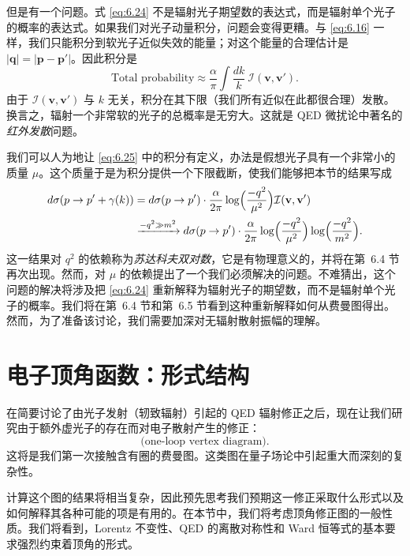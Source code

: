 但是有一个问题。式 \eqref{eq:6.24} 不是辐射光子期望数的表达式，而是辐射单个光子的概率的表达式。如果我们对光子动量积分，问题会变得更糟。与 \eqref{eq:6.16} 一样，我们只能积分到软光子近似失效的能量；对这个能量的合理估计是 $|\mathbf{q}| = |\mathbf{p}-\mathbf{p}'|$。因此积分是
\begin{equation}
  \text{Total probability} \approx \frac{\alpha}{\pi}\int \frac{dk}{k}\
    \mathcal{I}(\mathbf{v}, \mathbf{v}') .
  \label{eq:6.25}
\end{equation}
由于 $\mathcal{I}(\mathbf{v},\mathbf{v}')$ 与 $k$ 无关，积分在其下限（我们所有近似在此都很合理）发散。换言之，辐射一个非常软的光子的总概率是无穷大。这就是 QED 微扰论中著名的\emph{红外发散}问题。

我们可以人为地让 \eqref{eq:6.25} 中的积分有定义，办法是假想光子具有一个非常小的质量 $\mu$。这个质量于是为积分提供一个下限截断，使我们能够把本节的结果写成
\begin{equation}
  \begin{aligned}
    d\sigma(p\to p'+\gamma(k)) &= d\sigma(p\to p')\cdot
      \frac{\alpha}{2\pi}\log\Bigl( \frac{-q^2}{\mu^2} \Bigr)
      \mathcal{I}(\mathbf{v},\mathbf{v}')\\
    &\xrightarrow{-q^2\gg m^2}
    d\sigma(p\to p')\cdot \frac{\alpha}{2\pi}
      \log\Bigl( \frac{-q^2}{\mu^2} \Bigr)\log\Bigl( \frac{-q^2}{m^2} \Bigr).
  \end{aligned}
  \label{eq:6.26}
\end{equation}
这一结果对 $q^2$ 的依赖称为\emph{苏达科夫双对数}，它是有物理意义的，并将在第~6.4 节再次出现。然而，对 $\mu$ 的依赖提出了一个我们必须解决的问题。不难猜出，这个问题的解决将涉及把 \eqref{eq:6.24} 重新解释为辐射光子的期望数，而不是辐射单个光子的概率。我们将在第~6.4 节和第~6.5 节看到这种重新解释如何从费曼图得出。然而，为了准备该讨论，我们需要加深对无辐射散射振幅的理解。

\section{电子顶角函数：形式结构}

在简要讨论了由光子发射（轫致辐射）引起的 QED 辐射修正之后，现在让我们研究由于额外虚光子的存在而对电子散射产生的修正：
\begin{equation}
  \text{(one-loop vertex diagram)} .
  \label{eq:6.27}
\end{equation}
这将是我们第一次接触含有圈的费曼图。这类图在量子场论中引起重大而深刻的复杂性。

计算这个图的结果将相当复杂，因此预先思考我们预期这一修正采取什么形式以及如何解释其各种可能的项是有用的。在本节中，我们将考虑顶角修正图的一般性质。我们将看到，Lorentz 不变性、QED 的离散对称性和 Ward 恒等式的基本要求强烈约束着顶角的形式。

